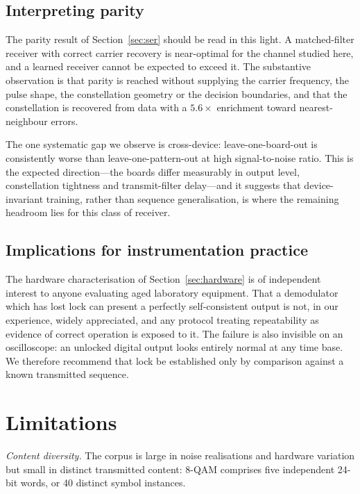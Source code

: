 \documentclass[journal]{IEEEtran}   %
\begin{document}
\subsection{Interpreting parity}
The parity result of Section~\ref{sec:ser} should be read in this light. A
matched-filter receiver with correct carrier recovery is near-optimal for the
channel studied here, and a learned receiver cannot be expected to exceed it.
The substantive observation is that parity is reached without supplying the
carrier frequency, the pulse shape, the constellation geometry or the decision
boundaries, and that the constellation is recovered from data with a $5.6\times$
enrichment toward nearest-neighbour errors.

The one systematic gap we observe is cross-device: leave-one-board-out is
consistently worse than leave-one-pattern-out at high signal-to-noise ratio.
This is the expected direction---the boards differ measurably in output level,
constellation tightness and transmit-filter delay---and it suggests that
device-invariant training, rather than sequence generalisation, is where the
remaining headroom lies for this class of receiver.

\subsection{Implications for instrumentation practice}
The hardware characterisation of Section~\ref{sec:hardware} is of independent
interest to anyone evaluating aged laboratory equipment. That a demodulator
which has lost lock can present a perfectly self-consistent output is not, in
our experience, widely appreciated, and any protocol treating repeatability as
evidence of correct operation is exposed to it. The failure is also invisible on
an oscilloscope: an unlocked digital output looks entirely normal at any time
base. We therefore recommend that lock be established only by comparison against
a known transmitted sequence.

\section{Limitations}
\label{sec:limitations}

\emph{Content diversity.} The corpus is large in noise realisations and hardware
variation but small in distinct transmitted content: 8-QAM comprises five
independent 24-bit words, or 40 distinct symbol instances.
\end{document}
